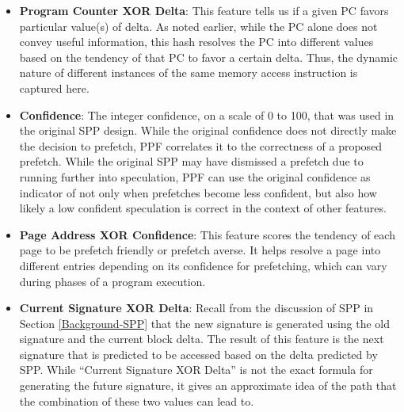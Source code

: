 \begin{itemize}
\item \textbf{Program Counter XOR Delta}: This feature tells us if a
  given PC favors particular value(s) of delta.  As noted earlier,
  while the PC alone does not convey useful information, this
  hash resolves the PC into different values based on the tendency of
  that PC to favor a certain delta.  Thus, the dynamic nature of
  different instances of the same memory access instruction is 
  captured here.

\item \textbf{Confidence}: The integer confidence, on a scale of 0 to
  100, that was used in the original SPP design. While the original 
  confidence does not directly make the decision to prefetch,
  PPF correlates it to the correctness of a proposed prefetch.
  While the original SPP may have dismissed a prefetch due to running
  further into speculation, PPF can use the original confidence as indicator
  of not only when prefetches become less confident, but also how likely
  a low confident speculation is correct in the context of other features.

\item \textbf{Page Address XOR Confidence}: This feature scores the
  tendency of each page to be prefetch friendly or prefetch averse. It
  helps resolve a page into different entries depending on its
  confidence for prefetching, which can vary during phases of a
  program execution.

\item \textbf{Current Signature XOR Delta}: Recall from the discussion
  of SPP in Section \ref{Background-SPP} that the new signature is
  generated using the old signature and the current block delta.
  The result of this feature is the next signature that is predicted to be
  accessed based on the delta predicted by SPP. While ``Current
  Signature XOR Delta'' is not the exact formula for generating the
  future signature, it gives an approximate idea of the path that the
  combination of these two values can lead to.



\end{itemize}
